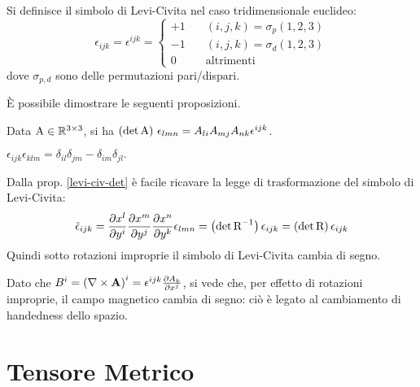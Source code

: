 \begin{definition}\label{def-lc}
	Si definisce il simbolo di Levi-Civita nel caso tridimensionale euclideo:
	\begin{equation}
		\epsilon_{ijk} = \epsilon^{ijk} = 
		\begin{cases}
			+1 &\quad (i,j,k) = \sigma_p(1,2,3) \\
			-1 &\quad (i,j,k) = \sigma_d(1,2,3) \\
			0  &\quad \text{altrimenti}
		\end{cases}
		\label{eq:10}
	\end{equation}
	dove $ \sigma_{p,d} $ sono delle permutazioni pari/dispari.
\end{definition}

È possibile dimostrare le seguenti proposizioni.

\begin{proposition}\label{levi-civ-det}
	Data $ \mathbf{\text{A}} \in \mathbb{R}^{3\times 3} $, si ha $ \left(\det\mathbf{\text{A}}\right)\, \epsilon_{lmn} = A_{li} A_{mj} A_{nk} \epsilon^{ijk} $.
\end{proposition}

\begin{proposition}\label{epsilon-delta}
	$ \epsilon_{ijk}\epsilon_{klm} = \delta_{il}\delta_{jm} - \delta_{im}\delta_{jl}.$
\end{proposition}

Dalla prop. \ref{levi-civ-det} è facile ricavare la legge di trasformazione del simbolo di Levi-Civita:
\begin{equation}
	\tilde{\epsilon}_{ijk} = \frac{\partial x^l}{\partial y^i} \frac{\partial x^m}{\partial y^j} \frac{\partial x^n}{\partial y^k} \epsilon_{lmn} = \left(\det\mathbf{\text{R}}^{-1}\right) \epsilon_{ijk} = \left(\det\mathbf{\text{R}}\right) \epsilon_{ijk}
	\label{eq:11}
\end{equation}
Quindi sotto rotazioni improprie il simbolo di Levi-Civita cambia di segno.

\begin{example}
	Dato che $ B^i = \left(\nabla\times\mathbf{A}\right)^i = \epsilon^{ijk}\frac{\partial A_k}{\partial x^j}$, si vede che, per effetto di rotazioni improprie, il campo magnetico cambia di segno: ciò è legato al cambiamento di handedness dello spazio.
\end{example}


\section{Tensore Metrico}


